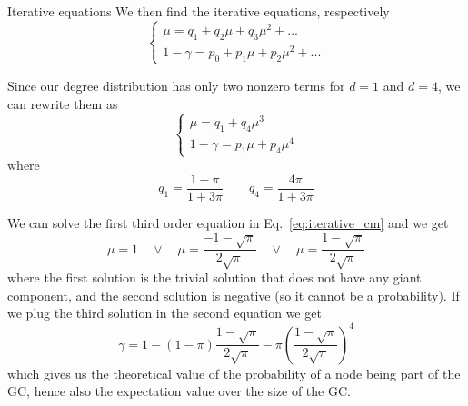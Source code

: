 \documentclass[handout]{beamer}
\begin{document}
\begin{frame}{Iterative equations}
    We then find the iterative equations, respectively
    \begin{equation}
        \begin{cases}
            \mu = q_1 + q_2 \mu + q_3 \mu^2 + ...\\
            1 - \gamma = p_0 + p_1 \mu + p_2 \mu^2 + ...
        \end{cases}
        \label{eq:iterative}
    \end{equation}

    Since our degree distribution has only two nonzero terms for $d=1$ and
    $d=4$, we can rewrite them as
    \begin{equation}
        \begin{cases}
            \mu = q_1 + q_4 \mu^3\\
            1 - \gamma = p_1 \mu + p_4 \mu^4
        \end{cases}
        \label{eq:iterative_cm}
    \end{equation}
    where
    $$
    q_1 = \frac{1-\pi}{1+3\pi} \qquad q_4 = \frac{4\pi}{1+3\pi}
    $$
\end{frame}

\begin{frame}{}
    We can solve the first third order equation in Eq.~\ref{eq:iterative_cm} and
    we get
    $$
    \mu = 1 \quad \lor \quad \mu = \frac{-1-\sqrt{\pi}}{2\sqrt{\pi}} \quad
    \lor \quad \mu = \frac{1-\sqrt{\pi}}{2\sqrt{\pi}}
    $$
    where the first solution is the trivial solution that does not have any
    giant component, and the second solution is negative (so it cannot be a
    probability). If we plug the third solution in the second equation we get
    \begin{equation}
        \gamma = 1 - (1-\pi) \frac{1-\sqrt{\pi}}{2\sqrt{\pi}} - \pi \left(
        \frac{1-\sqrt{\pi}}{2\sqrt{\pi}} \right)^4
        \label{eq:gamma_final}
    \end{equation}
    which gives us the theoretical value of the probability of a node being part
    of the GC, hence also the expectation value over the size of the GC.
\end{frame}
\end{document}

